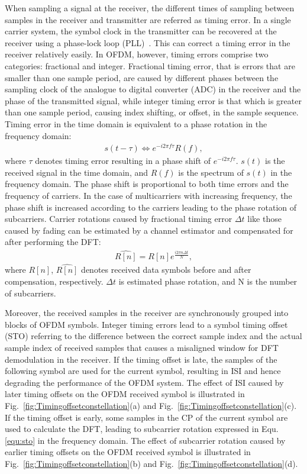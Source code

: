 When sampling a signal at the receiver, the different times of sampling between samples in the receiver and transmitter are referred as timing error.
In a single carrier system, the symbol clock in the transmitter can be recovered at the receiver using a phase-lock loop (PLL)~\cite{farhang2008signal}.
This can correct a timing error in the receiver relatively easily.
In OFDM, however, timing errors comprise two categories: fractional and integer.
Fractional timing error, that is errors that are smaller than one sample period, are caused by different phases between the sampling clock of the analogue to digital converter (ADC) in the receiver and the phase of the transmitted signal, while integer timing error is that which is greater than one sample period, causing index shifting, or offset, in the sample sequence.
Timing error in the time domain is equivalent to a phase rotation in the frequency domain:
\begin{eqnarray}
\label{equ:timingoffset}
               s (t - \tau )   \Leftrightarrow  e^{-i2\pi f\tau} R(f),
\end{eqnarray}
where $\tau$ denotes timing error resulting in a phase shift of $e^{-i2\pi f\tau}$.
$s(t)$ is the received signal in the time domain, and $R(f)$ is the spectrum of $s(t)$ in the frequency domain.
The phase shift is proportional to both time errors and the frequency of carriers.
In the case of multicarriers with increasing frequency, the phase shift is increased according to the carriers leading to the phase rotation of subcarriers.
Carrier rotations caused by fractional timing error $\Delta t$ like those caused by fading can be estimated by a channel estimator and compensated for after performing the DFT:
\begin{eqnarray}
\label{equ:rotationcompensation}
               \widehat{R[n]} = R[n] e^{\frac{i2\pi n \Delta  t}{N}},
\end{eqnarray}
where $R[n]$, $\widehat{R[n]}$ denotes received data symbols before and after compensation, respectively. $\Delta t$ is estimated phase rotation, and N is the number of subcarriers.

Moreover, the received samples in the receiver are synchronously grouped into blocks of OFDM symbols.
Integer timing errors lead to a symbol timing offset (STO) referring to the difference between the correct sample index and the actual sample index of received samples that causes a misaligned window for DFT demodulation in the receiver.
If the timing offset is late, the samples of the following symbol are used for the current symbol, resulting in ISI and hence degrading the performance of the OFDM system. The effect of ISI caused by later timing offsets on the OFDM received symbol is illustrated in Fig.~\ref{fig:Timingoffsetconstellation}(a) and Fig.~\ref{fig:Timingoffsetconstellation}(c).
If the timing offset is early, some samples in the CP of the current symbol are used to calculate the DFT, leading to subcarrier rotation expressed in Equ.\ref{equ:sto} in the frequency domain.
The effect of subcarrier rotation caused by earlier timing offsets on the OFDM received symbol is illustrated in Fig.~\ref{fig:Timingoffsetconstellation}(b) and Fig.~\ref{fig:Timingoffsetconstellation}(d).

